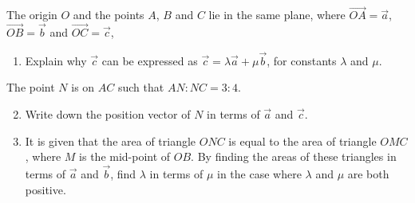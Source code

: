 \documentclass{jhwhw}
\begin{document}

    \problem{}
        \begin{center}
        \end{center}

        The origin $O$ and the points $A$, $B$ and $C$ lie in the same plane, where $\overrightarrow{OA} = \vec a$, $\overrightarrow{OB} = \vec b$ and $\overrightarrow{OC} = \vec c$,

        \begin{enumerate}
            \item Explain why $\vec c$ can be expressed as $\vec c = \lambda \vec a + \mu \vec b$, for constants $\lambda$ and $\mu$.
        \end{enumerate}

        \noindent The point $N$ is on $AC$ such that $AN : NC = 3 : 4$.

        \begin{enumerate}
            \setcounter{enumi}{1}
            \item Write down the position vector of $N$ in terms of $\vec a$ and $\vec c$.
            \item It is given that the area of triangle $ONC$ is equal to the area of triangle $OMC$, where $M$ is the mid-point of $OB$. By finding the areas of these triangles in terms of $\vec a$ and $\vec b$, find $\lambda$ in terms of $\mu$ in the case where $\lambda$ and $\mu$ are both positive.
        \end{enumerate}
\end{document}
